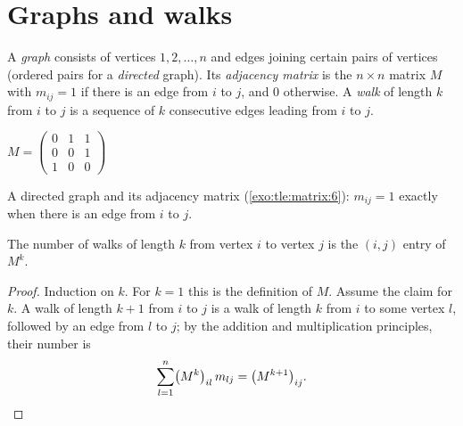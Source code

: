 \section{Graphs and walks}

\begin{definition}\label{def:tle:matrix:graph}
A \emph{graph} consists of vertices $1, 2, \dots, n$ and edges
joining certain pairs of vertices (ordered pairs for a \emph{directed}
graph). Its \emph{adjacency matrix} is the
$n \times n$ matrix $M$ with $m_{ij} = 1$ if there is an edge from $i$ to
$j$, and $0$ otherwise. A \emph{walk} of length $k$ from $i$ to $j$ is a
sequence of $k$ consecutive edges leading from $i$ to $j$.
\end{definition}

\begin{omfigure}
\qquad\qquad
$M = \begin{pmatrix} 0 & 1 & 1\\ 0 & 0 & 1\\ 1 & 0 & 0 \end{pmatrix}$

{\small A directed graph and its adjacency matrix
(\cref{exo:tle:matrix:6}): $m_{ij} = 1$ exactly when there is an edge
from $i$ to $j$.}
\end{omfigure}

\begin{theorem}\label{thm:tle:matrix:walks}
The number of walks of length $k$ from vertex $i$ to vertex $j$ is the
$(i,j)$ entry of $M^k$.
\end{theorem}

\begin{proof}
Induction on $k$. For $k = 1$ this is the definition of $M$. Assume the
claim for $k$. A walk of length $k+1$ from $i$ to $j$ is a walk of length
$k$ from $i$ to some vertex $l$, followed by an edge from $l$ to $j$; by the
addition and multiplication principles, their number is
\[
\sum_{l=1}^{n} \bigl(M^k\bigr)_{il}\, m_{lj} = \bigl(M^{k+1}\bigr)_{ij}.
\qedhere
\]
\end{proof}

